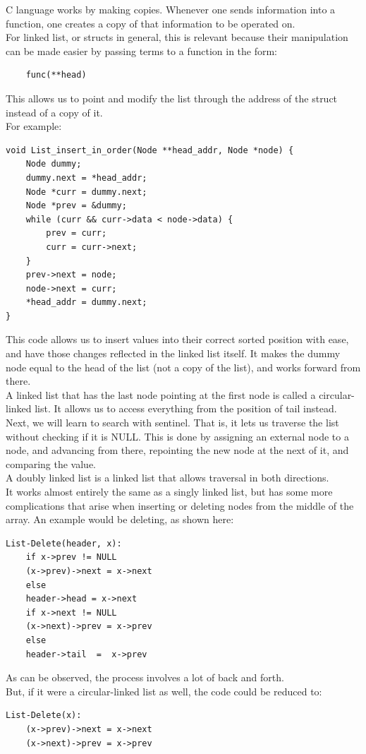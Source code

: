 \documentclass[nobib]{tufte-handout}
\begin{document}
C language works by making copies. Whenever one sends information into a function, one creates a copy of that information to be operated on.\\
For linked list, or structs in general, this is relevant because their manipulation can be made easier by passing terms to a function in the form:
\begin{lstlisting}
    func(**head)
\end{lstlisting}
This allows us to point and modify the list through the address of the struct instead of a copy of it.\\
For example:
\begin{lstlisting}
void List_insert_in_order(Node **head_addr, Node *node) {
    Node dummy;
    dummy.next = *head_addr;
    Node *curr = dummy.next;
    Node *prev = &dummy;
    while (curr && curr->data < node->data) {
        prev = curr;
        curr = curr->next;
    }
    prev->next = node;
    node->next = curr;
    *head_addr = dummy.next;
}
\end{lstlisting}
This code allows us to insert values into their correct sorted position with ease, and have those changes reflected in the linked list itself. It makes the dummy node equal to the head of the list (not a copy of the list), and works forward from there.\\
A linked list that has the last node pointing at the first node is called a circular-linked list. It allows us to access everything from the position of tail instead.\\
Next, we will learn to search with sentinel. That is, it lets us traverse the list without checking if it is NULL. This is done by assigning an external node to a node, and advancing from there, repointing the new node at the next of it, and comparing the value.\\
A doubly linked list is a linked list that allows traversal in both directions.\\
It works almost entirely the same as a singly linked list, but has some more complications that arise when inserting or deleting nodes from the middle of the array. An example would be deleting, as shown here:
\begin{lstlisting}
List-Delete(header, x):
    if x->prev != NULL
    (x->prev)->next = x->next
    else
    header->head = x->next
    if x->next != NULL
    (x->next)->prev = x->prev
    else
    header->tail  =  x->prev
\end{lstlisting}
As can be observed, the process involves a lot of back and forth.\\
But, if it were a circular-linked list as well, the code could be reduced to:
\begin{lstlisting}
List-Delete(x):
    (x->prev)->next = x->next
    (x->next)->prev = x->prev
\end{lstlisting}
\end{document}
